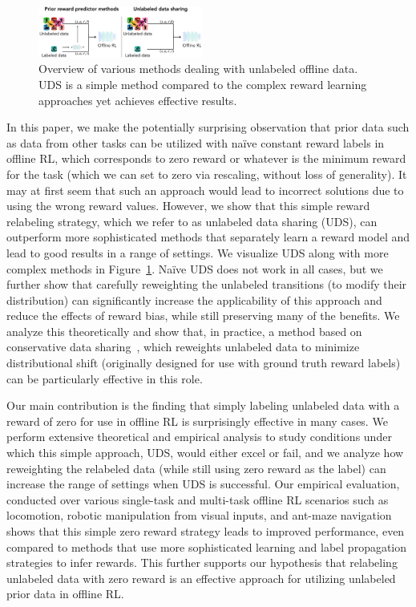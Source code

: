 \documentclass[nohyperref]{article}
\theoremstyle{plain}
\theoremstyle{definition}
\theoremstyle{remark}
\begin{document}
\begin{figure}[ht]
    \centering
    \includegraphics[width=0.48\textwidth]{teaser_new.png}
    \vspace{-0.6cm}
    \caption{\footnotesize  Overview of various methods dealing with unlabeled offline data. UDS is a simple method compared to the complex reward learning approaches yet achieves effective results.}
    \vspace{-0.55cm}
    \label{fig:teaser}
\end{figure}

In this paper, we make the potentially surprising observation that prior data such as data from other tasks can be utilized with na\"{i}ve constant reward labels in offline RL, which corresponds to zero reward or whatever is the minimum reward for the task (which we can set to zero via rescaling, without loss of generality). It may at first seem that such an approach would lead to incorrect solutions due to using the wrong reward values. However, we show that this simple reward relabeling strategy, which we refer to as unlabeled data sharing (UDS), can outperform more sophisticated methods that separately learn a reward model and lead to good results in a range of settings. We visualize UDS along with more complex methods in Figure~\ref{fig:teaser}. Na\"{i}ve UDS does not work in all cases, but we further show that carefully reweighting the unlabeled transitions (to modify their distribution) can significantly increase the applicability of this approach and reduce the effects of reward bias, while still preserving many of the benefits. {We analyze this theoretically and show that, in practice, a method based on conservative data sharing~\citep{yu2021conservative}, which reweights unlabeled data to minimize distributional shift (originally designed for use with ground truth reward labels) can be particularly effective in this role.}

Our main contribution is the finding that simply labeling unlabeled data with a reward of zero for use in offline RL is surprisingly effective in many cases. We perform extensive theoretical and empirical analysis to study conditions under which this simple approach, UDS, would either excel or fail, and we analyze how reweighting the relabeled data (while still using zero reward as the label) can increase the range of settings when UDS is successful. Our empirical evaluation, conducted over various single-task and multi-task offline RL scenarios such as locomotion, robotic manipulation from visual inputs, and ant-maze navigation shows that this simple zero reward strategy leads to improved performance, even compared to methods that use more sophisticated learning and label propagation strategies to infer rewards. This further supports our hypothesis that relabeling unlabeled data with zero reward is an effective approach for utilizing unlabeled prior data in offline RL.
\end{document}
